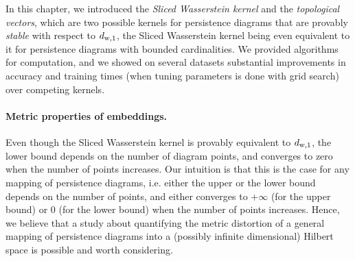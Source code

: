 In this chapter, we introduced the {\em Sliced Wasserstein kernel} and the {\em topological vectors},
which are two possible kernels for persistence diagrams that are provably {\em stable} with respect to $d_{{\rm w},1}$,
the Sliced Wasserstein kernel being even equivalent to it for persistence diagrams with bounded cardinalities.
We provided algorithms for computation,
and we showed on several datasets substantial improvements in accuracy and training times 
(when tuning parameters is done with grid search) over competing kernels. 

\paragraph*{Metric properties of embeddings.}
Even though the Sliced Wasserstein kernel is provably equivalent to $d_{{\rm w},1}$, the lower bound
depends on the number of diagram points, and converges to zero when the number of points increases.
Our intuition is that this is the case for any mapping of persistence diagrams, i.e. either the upper or the lower bound
depends on the number of points, and either converges to $+\infty$ (for the upper bound) or $0$ (for the lower bound) when the number
of points increases. Hence, we believe that a study about quantifying the metric distortion of a general mapping of persistence diagrams
into a (possibly infinite dimensional) Hilbert space is possible and worth considering. 


%
%
